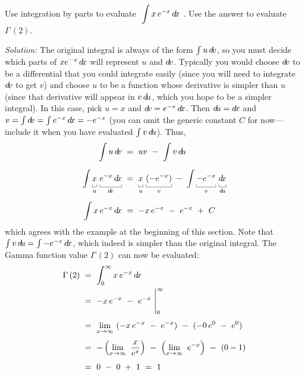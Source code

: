 \begin{exmp}\label{exmp:intparts1}
\noindent Use integration by parts to evaluate
$~\displaystyle\int x\,e^{-x}\,d\!x~$. Use the answer to evaluate
$\Gamma\,(2)$.\vspace{1mm}
\par\noindent\emph{Solution:} The original integral is always of the form
$\int u\,d\!v$, so you must decide which parts of $x e^{-x}\,d\!x$ will represent
$u$ and $d\!v$. Typically you would choose $d\!v$ to be a
differential that you could integrate easily (since you will need to integrate
$d\!v$ to get $v$) and choose $u$ to be a function whose
derivative is simpler than $u$ (since that derivative will appear in $v\,d\!u$,
which you hope to be a simpler integral). In this case, pick $u = x$ and
$d\!v = e^{-x}\,d\!x$. Then $d\!u = d\!x$ and
$v = \int d\!v = \int e^{-x}\,d\!x = -e^{-x}$ (you can omit the generic constant
$C$ for now---include it when you have evaluated $\int v\,d\!u$). Thus,
\begin{align*}
\int u\,\dv ~&=~ uv ~-~ \int v\,\du\\[6pt]
\int \underbracket[0.3pt]{x\vphantom{\tfrac{1}{2}}}_{u\vphantom{d}}\,\underbracket[0.3pt]{e^{-x}\,\dx\vphantom{\tfrac{1}{2}}}_{\dv} ~&=~
 \underbracket[0.3pt]{x\vphantom{\tfrac{1}{2}}}_{u\vphantom{d}}\,\underbracket[0.3pt]{(-e^{-x})\vphantom{\tfrac{1}{2}}}_{v\vphantom{d}} ~-~
 \int \underbracket[0.3pt]{-e^{-x}\vphantom{\tfrac{1}{2}}}_{v\vphantom{d}}\,\underbracket[0.3pt]{\dx\vphantom{\tfrac{1}{2}}}_{\du}\\[6pt]
\int x\,e^{-x}\,\dx ~&=~ -x\,e^{-x} ~-~ e^{-x} ~+~ C
\end{align*}
which agrees with the example at the beginning of this section. Note that
$\int v\,d\!u = \int -e^{-x}\,d\!x$, which indeed is simpler than the original
integral. The Gamma function value $\Gamma\,(2)$ can now be evaluated:
\begin{align*}
\Gamma\,(2) ~&=~ \int_0^{\infty} x\,e^{-x}\,d\!x\\
&=~ -x\,e^{-x} ~-~ e^{-x}~\Biggr|_{0}^{\infty}\\[4pt]
&=~ \lim_{x \to \infty}~(-x\,e^{-x} ~-~ e^{-x}) ~-~ (-0\,e^{0} ~-~ e^{0})\\[4pt]
&=~ -\left(\lim_{x \to \infty}~\frac{x}{e^x}\right) ~-~ \left(\lim_{x \to \infty}~e^{-x}\right) ~-~ (0 - 1)\\[4pt]
&=~ 0 ~-~ 0 ~+~ 1 ~=~ 1
\end{align*}
\end{exmp}
